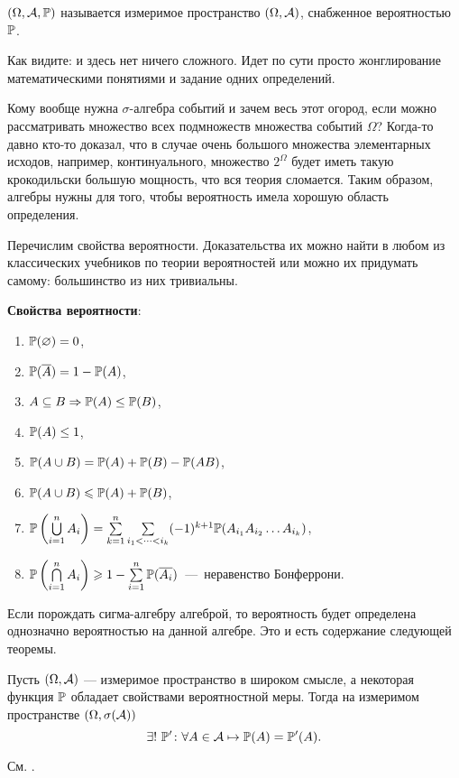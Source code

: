 \documentclass[../TV&MS.tex]{subfiles}
\begin{document}
\begin{Def}
	 $(\Omega, \mathcal{A}, \mathbb{P})$ называется измеримое 
	пространство $(\Omega, \mathcal{A})$, снабженное вероятностью $\mathbb{P}$.
\end{Def}
	
Как видите: и здесь нет ничего сложного. Идет по сути просто жонглирование математическими
понятиями и задание одних определений.
	
\begin{Wtf}
	Кому вообще нужна $\sigma$-алгебра событий и зачем весь этот огород, если можно 
	рассматривать множество всех подмножеств множества событий $\Omega$? Когда-то давно кто-то 
	доказал, что в случае очень большого множества элементарных исходов, например, 
	континуального, множество $2^{\Omega}$ будет иметь такую крокодильски большую мощность, 
	что вся теория сломается. Таким образом, алгебры нужны для того, чтобы вероятность имела 
	хорошую область определения.
\end{Wtf}

	Перечислим свойства вероятности. Доказательства их можно найти в любом из
	классических учебников по теории вероятностей или можно их придумать самому:
	большинство из них тривиальны.

\textbf{Свойства вероятности}:
\begin{enumerate}
	\item $\mathbb{P} (\varnothing) = 0$, 
	\item $\mathbb{P} (\overline{A}) = 1 - \mathbb{P} (A)$,
	\item $A \subseteq B \Rightarrow \mathbb{P} (A) \le \mathbb{P} (B)$,
	\item $\mathbb{P} (A) \le 1$,
	\item $\mathbb{P} (A \cup B) = \mathbb{P} (A) + \mathbb{P} (B) - \mathbb{P} (AB)$, 
	\item $\mathbb{P} (A \cup B) \leqslant \mathbb{P} (A) + \mathbb{P} (B)$,
	\item $\mathbb{P} \left(\bigcup\limits_{i=1}^{n} A_i\right) = 
	\sum\limits_{k=1}^{n} \sum\limits_{i_1<\dots <i_k} (-1)^{k+1} 
	\mathbb{P}(A_{i_1}A_{i_2}\ldots A_{i_k})$,
	\item $\mathbb{P} \left(\bigcap\limits_{i=1}^{n} A_i\right) \geqslant 1 - 
	\sum\limits_{i=1}^{n} \mathbb{P} (\overline{A_i})$~---~неравенство Бонферрони.
\end{enumerate}

Если порождать сигма-алгебру алгеброй, то вероятность будет определена
однозначно вероятностью на данной алгебре. Это и есть содержание
следующей теоремы.

\begin{Th}[Каратеодори]
Пусть $(\Omega, \mathcal{A})$ --- измеримое пространство в широком смысле, 
а некоторая функция $\mathbb{P}$ обладает свойствами вероятностной меры. 
Тогда на измеримом пространстве $(\Omega, \sigma(\mathcal{A}))$
$$
	\exists !\  \mathbb{P}' \colon \forall A \in \mathcal{A} \mapsto \mathbb{P}(A) = \mathbb{P}'(A).
$$
\end{Th}
\begin{Proof}
	См. \cite{Gusev}.
\end{Proof}
\end{document}
